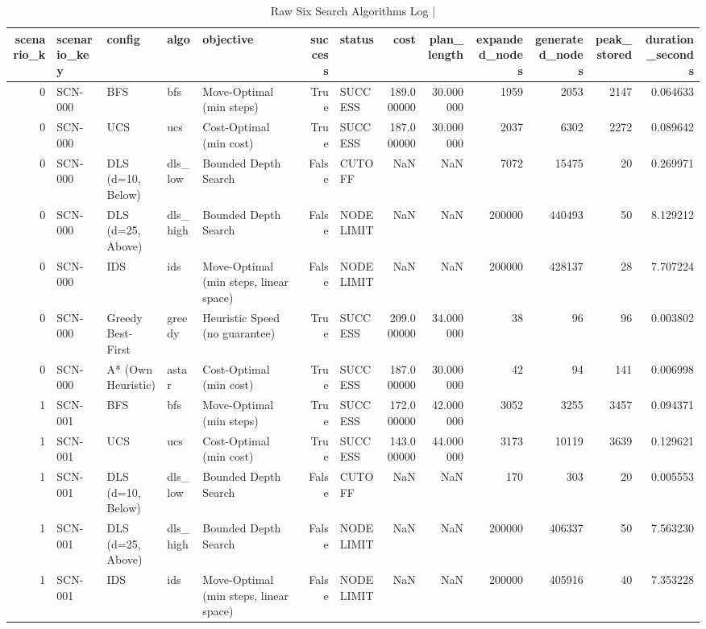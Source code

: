 \begin{table}[htbp]
\centering
\caption{Raw Six Search Algorithms Log | \stampline}
\label{tab:partB_six_algorithms_raw}
\begin{tabular}{rllllrlrrrrrr}
\toprule
scenario\_k & scenario\_key & config & algo & objective & success & status & cost & plan\_length & expanded\_nodes & generated\_nodes & peak\_stored & duration\_seconds \\
\midrule
0 & SCN-000 & BFS & bfs & Move-Optimal (min steps) & True & SUCCESS & 189.000000 & 30.000000 & 1959 & 2053 & 2147 & 0.064633 \\
0 & SCN-000 & UCS & ucs & Cost-Optimal (min cost) & True & SUCCESS & 187.000000 & 30.000000 & 2037 & 6302 & 2272 & 0.089642 \\
0 & SCN-000 & DLS (d=10, Below) & dls\_low & Bounded Depth Search & False & CUTOFF & NaN & NaN & 7072 & 15475 & 20 & 0.269971 \\
0 & SCN-000 & DLS (d=25, Above) & dls\_high & Bounded Depth Search & False & NODELIMIT & NaN & NaN & 200000 & 440493 & 50 & 8.129212 \\
0 & SCN-000 & IDS & ids & Move-Optimal (min steps, linear space) & False & NODELIMIT & NaN & NaN & 200000 & 428137 & 28 & 7.707224 \\
0 & SCN-000 & Greedy Best-First & greedy & Heuristic Speed (no guarantee) & True & SUCCESS & 209.000000 & 34.000000 & 38 & 96 & 96 & 0.003802 \\
0 & SCN-000 & A* (Own Heuristic) & astar & Cost-Optimal (min cost) & True & SUCCESS & 187.000000 & 30.000000 & 42 & 94 & 141 & 0.006998 \\
1 & SCN-001 & BFS & bfs & Move-Optimal (min steps) & True & SUCCESS & 172.000000 & 42.000000 & 3052 & 3255 & 3457 & 0.094371 \\
1 & SCN-001 & UCS & ucs & Cost-Optimal (min cost) & True & SUCCESS & 143.000000 & 44.000000 & 3173 & 10119 & 3639 & 0.129621 \\
1 & SCN-001 & DLS (d=10, Below) & dls\_low & Bounded Depth Search & False & CUTOFF & NaN & NaN & 170 & 303 & 20 & 0.005553 \\
1 & SCN-001 & DLS (d=25, Above) & dls\_high & Bounded Depth Search & False & NODELIMIT & NaN & NaN & 200000 & 406337 & 50 & 7.563230 \\
1 & SCN-001 & IDS & ids & Move-Optimal (min steps, linear space) & False & NODELIMIT & NaN & NaN & 200000 & 405916 & 40 & 7.353228 \\

\end{tabular}
\end{table}
